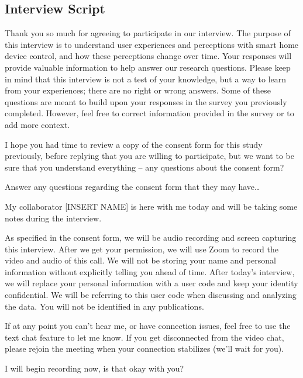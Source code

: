 \subsection{Interview Script}
\label{cic:appdx:interview}
Thank you so much for agreeing to participate in our interview. The purpose of this interview is to understand user experiences and perceptions with smart home device control, and how these perceptions change over time. Your responses will provide valuable information to help answer our research questions. Please keep in mind that this interview is not a test of your knowledge, but a way to learn from your experiences; there are no right or wrong answers. Some of these questions are meant to build upon your responses in the survey you previously completed. However, feel free to correct information provided in the survey or to add more context. 

I hope you had time to review a copy of the consent form for this study previously, before replying that you are willing to participate, but we want to be sure that you understand everything -- any questions about the consent form? 

Answer any questions regarding the consent form that they may have…

My collaborator [INSERT NAME] is here with me today and will be taking some notes during the interview.

As specified in the consent form, we will be audio recording and screen capturing this interview. After we get your permission, we will use Zoom to record the video and audio of this call. We will not be storing your name and personal information without explicitly telling you ahead of time. After today's interview, we will replace your personal information with a user code and keep your identity confidential. We will be referring to this user code when discussing and analyzing the data. You will not be identified in any publications. 

If at any point you can't hear me, or have connection issues, feel free to use the text chat feature to let me know. If you get disconnected from the video chat, please rejoin the meeting when your connection stabilizes (we'll wait for you). 

I will begin recording now, is that okay with you?

